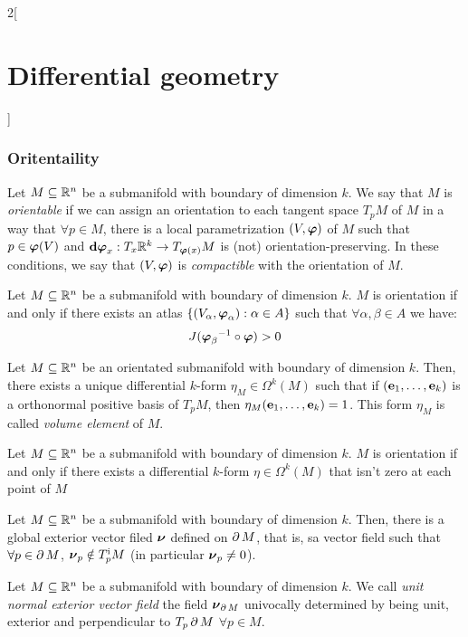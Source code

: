 \documentclass[../../../main.tex]{subfiles}
\begin{document}
\begin{multicols}{2}[\section{Differential geometry}]
  \subsubsection{Oritentaility}
  \begin{definition}
    Let $M\subseteq\mathbb{R}^n$ be a submanifold with boundary of dimension $k$. We say that $M$ is \emph{orientable} if we can assign an orientation to each tangent space $T_pM$ of $M$ in a way that $\forall p\in M$, there is a local parametrization $(V,\boldsymbol{\mathrm{\varphi}})$ of $M$ such that $p\in\boldsymbol{\mathrm{\varphi}}(V)$ and $\boldsymbol{\mathrm{d\varphi}}_x:T_x\mathbb{R}^k\rightarrow T_{\boldsymbol{\mathrm{\varphi}}(x)}M$ is (not) orientation-preserving. In these conditions, we say that $(V,\boldsymbol{\mathrm{\varphi}})$ is \emph{compactible} with the orientation of $M$.
  \end{definition}
  \begin{proposition}
    Let $M\subseteq\mathbb{R}^n$ be a submanifold with boundary of dimension $k$. $M$ is orientation if and only if there exists an atlas $\{(V_\alpha,\boldsymbol{\mathrm{\varphi}}_\alpha):\alpha\in A\}$ such that $\forall \alpha,\beta\in A$ we have: $$J({\boldsymbol{\mathrm{\varphi}}_\beta}^{-1}\circ\boldsymbol{\mathrm{\varphi}})>0$$
  \end{proposition}
  \begin{proposition}
    Let $M\subseteq\mathbb{R}^n$ be an orientated submanifold with boundary of dimension $k$. Then, there exists a unique differential $k$-form $\eta_M\in\Omega^k(M)$ such that if $(\boldsymbol{\mathrm{e}}_1,\ldots,\boldsymbol{\mathrm{e}}_k)$ is a orthonormal positive basis of $T_pM$, then $\eta_M(\boldsymbol{\mathrm{e}}_1,\ldots,\boldsymbol{\mathrm{e}}_k)=1$. This form $\eta_M$ is called \emph{volume element} of $M$.
  \end{proposition}
  \begin{proposition}
    Let $M\subseteq\mathbb{R}^n$ be a submanifold with boundary of dimension $k$. $M$ is orientation if and only if there exists a differential $k$-form $\eta\in\Omega^k(M)$ that isn't zero at each point of $M$
  \end{proposition}
  \begin{lemma}
    Let $M\subseteq\mathbb{R}^n$ be a submanifold with boundary of dimension $k$. Then, there is a global exterior vector filed $\boldsymbol{\mathrm{\nu}}$ defined on $\operatorname{\partial}{M}$, that is, sa vector field such that $\forall p\in\operatorname{\partial}{M}$, $\boldsymbol{\mathrm{\nu}}_p\notin T_p^\text{i}M$ (in particular $\boldsymbol{\mathrm{\nu}}_p\ne 0$).
  \end{lemma}
  \begin{definition}
    Let $M\subseteq\mathbb{R}^n$ be a submanifold with boundary of dimension $k$. We call \emph{unit normal exterior vector field} the field $\boldsymbol{\mathrm{\nu}}_{\operatorname{\partial}{M}}$ univocally determined by being unit, exterior and perpendicular to $T_p\operatorname{\partial}{M}$ $\forall p\in M$.

\end{definition}
\end{multicols}
\end{document}
